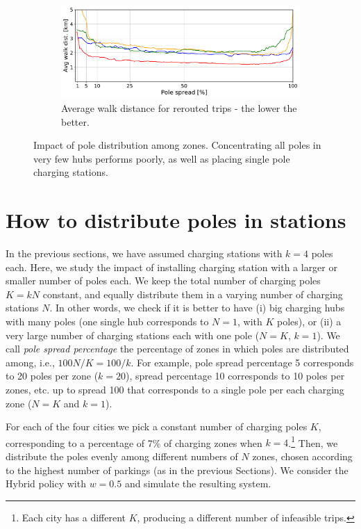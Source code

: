 \begin{figure}[t!]
\begin{center}
\begin{subfigure}{0.49\textwidth}
             \label{fig:zoneACS_vs_Reroute}
         \end{subfigure}        
         \begin{subfigure}{0.49\textwidth}
            \includegraphics[width=\columnwidth]{figures/50_AvgWalkedDistance_vsZones_ACS.pdf}
             \caption{Average walk distance for rerouted trips - the lower the better.}
             \label{fig:zoneACS_vs_awd}
         \end{subfigure}
         \caption{Impact of pole distribution among zones. Concentrating all poles in very few hubs performs poorly, as well as placing single pole charging stations.}
         \label{fig:zoneACS}
\end{center}
\end{figure}

\section{How to distribute poles in stations}
\label{sec:resPoles}

In the previous sections, we have assumed charging stations with $k=4$ poles each. Here, we study the impact of installing charging station with a larger or smaller number of poles each. We keep the total number of charging poles $K=kN$ constant, and equally distribute them in a varying number of charging stations $N$. In other words, we check if it is better to have (i) big charging hubs with many poles (one single hub corresponds to $N=1$, with $K$ poles), or (ii) a very large number of charging stations each with one pole ($N=K$, $k=1$).
We call {\it pole spread percentage} the percentage of zones in which poles are distributed among, i.e., $100N/K = 100/k$. For example, pole spread percentage 5 corresponds to 20 poles per zone ($k=20$), spread percentage 10 corresponds to 10 poles per zones, etc. up to spread 100 that corresponds to a single pole per each charging zone ($N=K$ and $k=1$).

For each of the four cities we pick a constant number of charging poles $K$, corresponding to a percentage of 7\% of charging zones when $k=4$.\footnote{Each city has a different $K$, producing a different number of infeasible trips.} Then, we distribute the poles evenly among different numbers of $N$ zones, chosen according to the highest number of parkings (as in the previous Sections). 
We consider the Hybrid policy with $w=0.5$ and simulate the  resulting system. 

